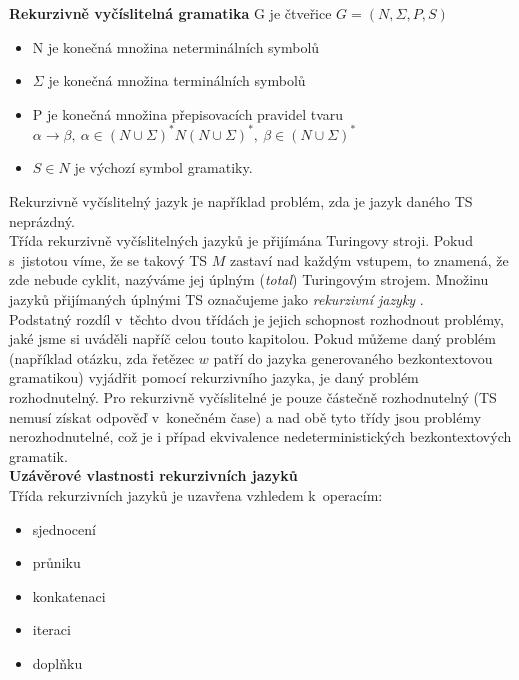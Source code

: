 \textbf{Rekurzivně vyčíslitelná gramatika} G je čtveřice $G = (N, \Sigma, P, S)$
\begin{itemize}
\item N je konečná množina neterminálních symbolů
\item $\Sigma$ je konečná množina terminálních symbolů
\item P je konečná množina přepisovacích pravidel tvaru \\
$\alpha \rightarrow \beta, \ \alpha \in (N \cup \Sigma)^*N(N \cup \Sigma)^*, \ \beta \in (N \cup \Sigma)^*$
\item $S \in N$ je výchozí symbol gramatiky.
\end{itemize}
\Bat{} Rekurzivně vyčíslitelný jazyk je například problém, zda je jazyk daného TS neprázdný. \\

Třída rekurzivně vyčíslitelných jazyků je přijímána Turingovy stroji. Pokud s~jistotou víme, že se takový TS $M$ zastaví
nad každým vstupem, to znamená, že zde nebude cyklit, nazýváme jej úplným (\textit{total}) Turingovým strojem. Množinu jazyků
přijímaných úplnými TS označujeme jako \textit{rekurzivní jazyky} \cite[str. 115]{TIN2013}. \\

Podstatný rozdíl v~těchto dvou třídách je jejich schopnost rozhodnout problémy, jaké jsme si uváděli napříč celou touto kapitolou.
Pokud můžeme daný problém (například otázku, zda řetězec $w$ patří do jazyka generovaného bezkontextovou gramatikou) vyjádřit pomocí rekurzivního jazyka,
je daný problém rozhodnutelný. Pro rekurzivně vyčíslitelné je pouze částečně rozhodnutelný (TS nemusí získat odpověď v~konečném čase)
a nad obě tyto třídy jsou problémy nerozhodnutelné, což je i případ ekvivalence nedeterministických bezkontextových gramatik. \\

\textbf{Uzávěrové vlastnosti rekurzivních jazyků} \\
Třída rekurzivních jazyků je uzavřena vzhledem k~operacím:
\begin{itemize}
\item sjednocení
\item průniku
\item konkatenaci
\item iteraci 
\item doplňku \cite[str. 119]{TIN2013}
\end{itemize}
\vspace*{\baselineskip}

